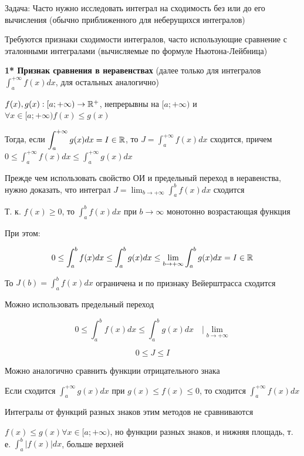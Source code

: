 \documentclass[12pt]{article}
\begin{document}
    Задача: Часто нужно исследовать интеграл на сходимость без или до его вычисления (обычно приближенного для неберущихся интегралов)

    Требуются признаки сходимости интегралов, часто использующие сравнение с эталонными интегралами (вычисляемые по формуле Ньютона-Лейбница)

    \hypertarget{improperintegralconvergenceininequalities}{}
    \textbf{1* Признак сравнения в неравенствах} (далее только для интегралов $\displaystyle \int^{+\infty}_{a} f(x) dx$, для остальных аналогично)

    $f(x), g(x) : [a;+\infty) \to \mathbb{R}^+$, непрерывны на $[a;+\infty)$ и $\forall x \in [a;+\infty) f(x) \leq g(x)$


    Тогда, если $\displaystyle \int^{+\infty}_{a} g(x) dx = I \in \mathbb{R}$, то $\displaystyle J = \int^{+\infty}_{a} f(x) dx$ сходится,
    причем $\displaystyle0 \leq \int^{+\infty}_{a} f(x) dx \leq \int^{+\infty}_{a} g(x) dx$

    Прежде чем использовать свойство ОИ и предельный переход в неравенства,
    нужно доказать, что интеграл $\displaystyle J = \lim_{b \to +\infty} \int^{b}_{a} f(x) dx$ сходится

    Т. к. $f(x) \geq 0$, то $\displaystyle \int^{b}_{a}f(x)dx$ при $b \to \infty$ монотонно возрастающая функция

    При этом:

    \[0 \leq \int^{b}_{a}f(x)dx \leq \int^{b}_{a}g(x)dx \leq \lim_{b \to +\infty} \int^{b}_{a}g(x)dx = I \in \mathbb{R}\]

    То $\displaystyle J(b) = \int^b_a f(x)dx$ ограничена и по признаку Вейерштрасса сходится

    Можно использовать предельный переход

    \[0 \leq \int^{b}_{a}f(x)dx \leq \int^{b}_{a}g(x)dx \quad \Big| \lim_{b \to +\infty}\]

    \[0 \leq J \leq I\]

    \Nota Можно аналогично сравнить функции отрицательного знака

    Если сходится $\displaystyle \int^{+\infty}_{a} g(x) dx$ при $g(x) \leq f(x) \leq 0$, то сходится $\displaystyle \int^{+\infty}_{a} f(x) dx$

    Интегралы от функций разных знаков этим методов не сравниваются

    $f(x) \leq g(x) \forall x \in [a;+\infty)$, но функции разных знаков, и нижняя площадь, т. е. $\displaystyle \int^{b}_{a} |f(x)| dx$, больше верхней
\end{document}
